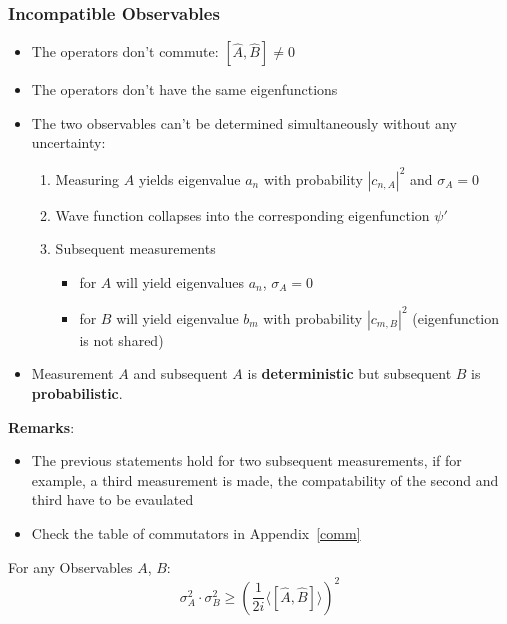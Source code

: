\subsubsection{Incompatible Observables}

\begin{itemize}
    \item The operators don't commute: $[\widehat{A}, \widehat{B}] \neq 0$
    \item The operators don't have the same eigenfunctions
    \item The two observables can't be determined simultaneously without any uncertainty:
          \begin{enumerate}
              \item Measuring $A$ yields eigenvalue $a_n$ with probability $|c_{n,A}|^2$ and $\sigma_A=0$
              \item Wave function collapses into the corresponding eigenfunction $\psi'$
              \item Subsequent measurements
                    \begin{itemize}
                        \item for $A$ will yield eigenvalues $a_n$, $\sigma_A=0$
                        \item for $B$ will yield eigenvalue $b_m$ with probability $|c_{m,B}|^2$ (eigenfunction is not shared)
                    \end{itemize}
          \end{enumerate}
    \item Measurement $A$ and subsequent $A$ is \textbf{deterministic} but subsequent $B$ is \textbf{probabilistic}.

\end{itemize}

\textbf{Remarks}:
\begin{itemize}
    \item The previous statements hold for two subsequent measurements, if for example, a third measurement is made, the compatability of the second and third have to be evaulated
    \item Check the table of commutators in Appendix\ \ref{comm}
\end{itemize}

\newpar{}

For any Observables $A$, $B$:
\begin{equation*}
    \sigma_A^2\cdot\sigma_B^2\geqslant{\left(\frac1{2i}\langle[\hat{A},\hat{B}]\rangle\right)}^2
\end{equation*}

